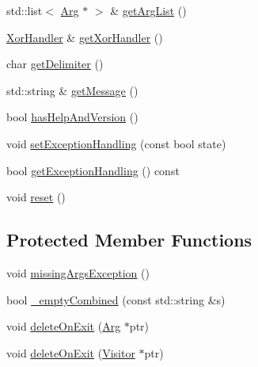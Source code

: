 \begin{DoxyCompactItemize}
\item 
std\+::list$<$ \hyperlink{class_t_c_l_a_p_1_1_arg}{Arg} $\ast$ $>$ \& \hyperlink{class_t_c_l_a_p_1_1_cmd_line_a3c281da929a281fb883ea47632b7ad38}{get\+Arg\+List} ()
\item 
\hyperlink{class_t_c_l_a_p_1_1_xor_handler}{Xor\+Handler} \& \hyperlink{class_t_c_l_a_p_1_1_cmd_line_a805433b7718d1bc5bc9317bbd061449b}{get\+Xor\+Handler} ()
\item 
char \hyperlink{class_t_c_l_a_p_1_1_cmd_line_a3e9f0ac2c1e97d1f8527da713ddd5a8f}{get\+Delimiter} ()
\item 
std\+::string \& \hyperlink{class_t_c_l_a_p_1_1_cmd_line_a8f61a8c201e31ada985fa998180fd40f}{get\+Message} ()
\item 
bool \hyperlink{class_t_c_l_a_p_1_1_cmd_line_a5b23895feae4f4110b77dae372226475}{has\+Help\+And\+Version} ()
\item 
void \hyperlink{class_t_c_l_a_p_1_1_cmd_line_aa02055d8f4864bfa9b505e2d26bbbd87}{set\+Exception\+Handling} (const bool state)
\item 
bool \hyperlink{class_t_c_l_a_p_1_1_cmd_line_af2cd748a91e22df97c878d7eff8c4ca3}{get\+Exception\+Handling} () const 
\item 
void \hyperlink{class_t_c_l_a_p_1_1_cmd_line_a1721ec47c9d9f5ea2eca2f385fcfd2da}{reset} ()
\end{DoxyCompactItemize}
\subsection*{Protected Member Functions}
\begin{DoxyCompactItemize}
\item 
void \hyperlink{class_t_c_l_a_p_1_1_cmd_line_a698f47333350312eb949aa1ae4f89ad1}{missing\+Args\+Exception} ()
\item 
bool \hyperlink{class_t_c_l_a_p_1_1_cmd_line_a170a4e711c2a6d58a05e9ad3bc03c08a}{\+\_\+empty\+Combined} (const std\+::string \&s)
\item 
void \hyperlink{class_t_c_l_a_p_1_1_cmd_line_a42d669ed2037ac24fc78883aa8600655}{delete\+On\+Exit} (\hyperlink{class_t_c_l_a_p_1_1_arg}{Arg} $\ast$ptr)
\item 
void \hyperlink{class_t_c_l_a_p_1_1_cmd_line_a262b8d929eb5b0dfbfc17637c1325c36}{delete\+On\+Exit} (\hyperlink{class_t_c_l_a_p_1_1_visitor}{Visitor} $\ast$ptr)
\end{DoxyCompactItemize}
